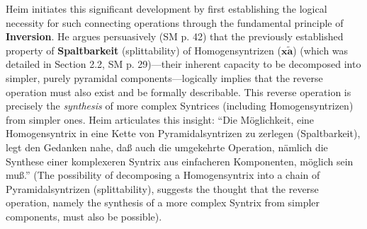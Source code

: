\documentclass[12pt]{article}
\newcommand{\q}[1]{\enquote{#1}}
\newcommand{\homogeneoussyntrix}{\bm{x\widetilde{a}}}
\begin{document}
Heim initiates this significant development by first establishing the logical necessity for such connecting operations through the fundamental principle of \textbf{Inversion}. He argues persuasively (SM p. 42) that the previously established property of \textbf{Spaltbarkeit} (splittability) of Homogensyntrizen (\(\homogeneoussyntrix\)) (which was detailed in Section 2.2, SM p. 29)—their inherent capacity to be decomposed into simpler, purely pyramidal components—logically implies that the reverse operation must also exist and be formally describable. This reverse operation is precisely the \textit{synthesis} of more complex Syntrices (including Homogensyntrizen) from simpler ones. Heim articulates this insight: \q{Die Möglichkeit, eine Homogensyntrix in eine Kette von Pyramidalsyntrizen zu zerlegen (Spaltbarkeit), legt den Gedanken nahe, daß auch die umgekehrte Operation, nämlich die Synthese einer komplexeren Syntrix aus einfacheren Komponenten, möglich sein muß.} (The possibility of decomposing a Homogensyntrix into a chain of Pyramidalsyntrizen (splittability), suggests the thought that the reverse operation, namely the synthesis of a more complex Syntrix from simpler components, must also be possible).
\end{document}
